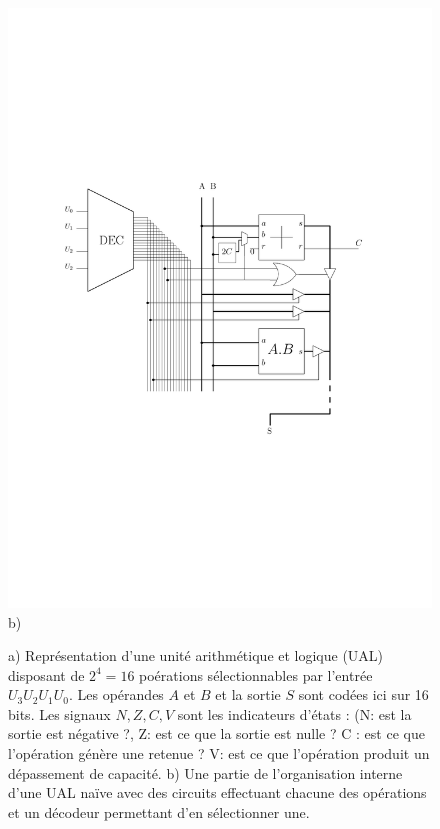 \begin{figure}[htbp]
\begin{minipage}[c]{.58\linewidth}
\includegraphics[width=\columnwidth]{Figs/ual_inner.pdf}\\\centering b)
   \end{minipage}
\caption{\label{fig:ual} a) Représentation d'une unité arithmétique et logique (UAL) disposant de $2^4 = 16$ poérations sélectionnables par l'entrée $U_3U_2U_1U_0$. Les opérandes $A$ et $B$ et la sortie $S$ sont codées ici sur 16 bits. Les signaux $N, Z, C, V$ sont les indicateurs d'états : (N: est la sortie est négative ?, Z: est ce que la sortie est nulle ? C : est ce que l'opération génère une retenue ? V: est ce que l'opération produit un dépassement de capacité. b) Une partie de l'organisation interne d'une UAL naïve avec des circuits effectuant chacune des opérations et un décodeur permettant d'en sélectionner une.}
\end{figure}

